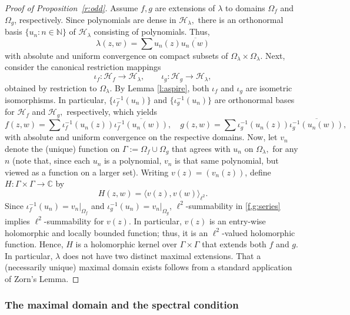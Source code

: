 \documentclass[a4paper,reqno,index]{amsart}
\numberwithin{equation}{section}
\newcommand{\NN}{\mathbb{N}}
\newcommand{\cH}{\mathcal{H}}
\newcommand{\ol}[1]{\overline{#1}}
\theoremstyle{definition}
\begin{document}
   \begin{proof}[Proof of Proposition~\ref{r:odd}]
    Assume $f,g$ are extensions of $\lambda$ to domains $\Omega_f$ and $\Omega_g$, respectively.
        Since polynomials are dense in $\cH_\lambda,$ there is an orthonormal basis $\{u_n:n\in\NN\}$
    of $\cH_\lambda$ consisting of polynomials. Thus,
 \begin{equation*}
     \lambda(z,w) = \sum u_n(z)\ol{u_n(w)}
 \end{equation*}
  with absolute and uniform convergence on compact subsets of $\Omega_\lambda \times\Omega_\lambda.$ Next, consider the canonical restriction mappings
  \[\iota_f: \mathcal{H}_{f}\to \mathcal{H}_\lambda, \qquad \iota_g: \mathcal{H}_{g}\to \mathcal{H}_\lambda,\]
  obtained by restriction to $\Omega_\lambda.$ By Lemma \ref{l:aspire}, both $\iota_f$ and $\iota_g$ are isometric isomorphisms. In particular, $\{\iota_f^{-1}(u_n)\}$ and $\{\iota^{-1}_g(u_n)\}$ are orthonormal bases for $\mathcal{H}_f$ and $\mathcal{H}_g,$ respectively, which yields 
  \begin{equation}
     \label{f,g:series}f(z, w)=\sum \iota^{-1}_f(u_n(z)) \overline{\iota^{-1}_f(u_n(w))}, \quad g(z, w)=\sum \iota^{-1}_g(u_n(z)) \overline{\iota^{-1}_g(u_n(w))},
     \end{equation}
  with absolute and uniform convergence on the respective domains. Now, let $v_n$ denote the (unique) function 
   on $\Gamma:=\Omega_f\cup\Omega_g$ that agrees with $u_n$ on $\Omega_\lambda,$ for any $n$ (note that, since each $u_n$ is a polynomial, $v_n$ is that same polynomial, but viewed as a function on a larger set). Writing $v(z)=(v_n(z))$, define $H:\Gamma\times\Gamma\to\mathbb{C}$ by 
  \[H(z,w)=\langle v(z), v(w) \rangle_{\ell^2}.\]
  Since $\iota_f^{-1}(u_n)=v_n|_{\Omega_f}$ and $\iota_g^{-1}(u_n)=v_n|_{\Omega_g}$, $\ell^2$-summability in \eqref{f,g:series} implies $\ell^2$-summability for $v(z).$ In particular, $v(z)$ is an entry-wise holomorphic and locally bounded function; thus, it is an $\ell^2$-valued holomorphic function. Hence,  $H$ is a holomorphic kernel over $\Gamma\times\Gamma$  that extends both $f$ and $g.$ In particular, $\lambda$ does not have two distinct maximal extensions.
 That a (necessarily unique) maximal domain exists follows from a standard application of Zorn's Lemma.
\end{proof}


\subsubsection{The maximal domain and the spectral condition}
\end{document}
